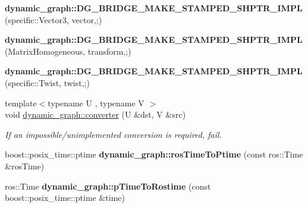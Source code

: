 \begin{DoxyCompactItemize}
\item 
{\bfseries dynamic\+\_\+graph\+::\+D\+G\+\_\+\+B\+R\+I\+D\+G\+E\+\_\+\+M\+A\+K\+E\+\_\+\+S\+T\+A\+M\+P\+E\+D\+\_\+\+S\+H\+P\+T\+R\+\_\+\+I\+M\+PL} (specific\+::\+Vector3, vector,;)\hypertarget{namespacedynamic__graph_a959196c1e676ca84b2e1b7c2dda8e982}{}\label{namespacedynamic__graph_a959196c1e676ca84b2e1b7c2dda8e982}

\item 
{\bfseries dynamic\+\_\+graph\+::\+D\+G\+\_\+\+B\+R\+I\+D\+G\+E\+\_\+\+M\+A\+K\+E\+\_\+\+S\+T\+A\+M\+P\+E\+D\+\_\+\+S\+H\+P\+T\+R\+\_\+\+I\+M\+PL} (Matrix\+Homogeneous, transform,;)\hypertarget{namespacedynamic__graph_a724ed2c3a6a902fc23526ffadc0b864a}{}\label{namespacedynamic__graph_a724ed2c3a6a902fc23526ffadc0b864a}

\item 
{\bfseries dynamic\+\_\+graph\+::\+D\+G\+\_\+\+B\+R\+I\+D\+G\+E\+\_\+\+M\+A\+K\+E\+\_\+\+S\+T\+A\+M\+P\+E\+D\+\_\+\+S\+H\+P\+T\+R\+\_\+\+I\+M\+PL} (specific\+::\+Twist, twist,;)\hypertarget{namespacedynamic__graph_a8b3e9c1129e4232f6db8ed3cb2a0496f}{}\label{namespacedynamic__graph_a8b3e9c1129e4232f6db8ed3cb2a0496f}

\item 
{\footnotesize template$<$typename U , typename V $>$ }\\void \hyperlink{namespacedynamic__graph_a38ff488b8b21c0b4f4d7f44572fa4ee5}{dynamic\+\_\+graph\+::converter} (U \&dst, V \&src)
\begin{DoxyCompactList}\small\item\em If an impossible/unimplemented conversion is required, fail. \end{DoxyCompactList}\item 
boost\+::posix\+\_\+time\+::ptime {\bfseries dynamic\+\_\+graph\+::ros\+Time\+To\+Ptime} (const ros\+::\+Time \&ros\+Time)\hypertarget{namespacedynamic__graph_ae79d27ce6f0c5bc0788a4fb4bd33f363}{}\label{namespacedynamic__graph_ae79d27ce6f0c5bc0788a4fb4bd33f363}

\item 
ros\+::\+Time {\bfseries dynamic\+\_\+graph\+::p\+Time\+To\+Rostime} (const boost\+::posix\+\_\+time\+::ptime \&time)\hypertarget{namespacedynamic__graph_a3d2b2b3f2e9363d80c0abb64c4408e66}{}\label{namespacedynamic__graph_a3d2b2b3f2e9363d80c0abb64c4408e66}

\end{DoxyCompactItemize}


